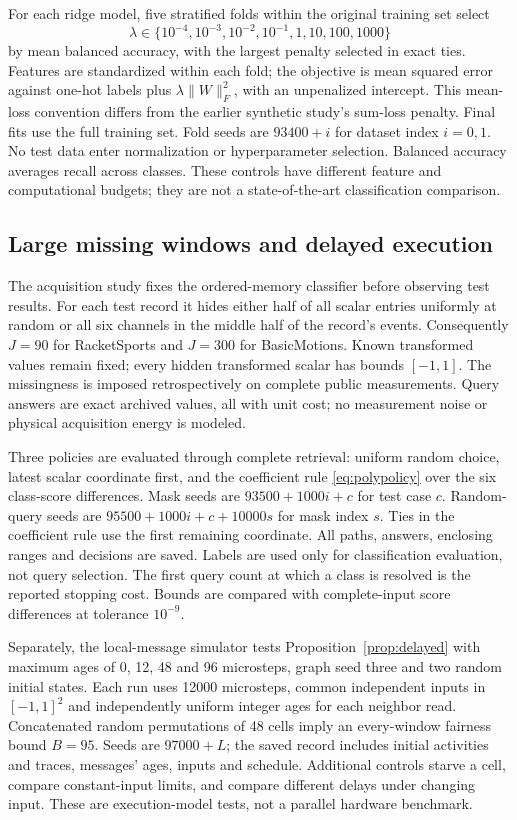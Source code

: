 \documentclass[11pt,a4paper]{article}
\theoremstyle{definition}\newtheorem{definition}[theorem]{Definition}
\begin{document}
For each ridge model, five stratified folds within the original training set select
\[
 \lambda\in\{10^{-4},10^{-3},10^{-2},10^{-1},1,10,100,1000\}
\]
by mean balanced accuracy, with the largest penalty selected in exact ties. Features are standardized within each fold; the objective is mean squared error against one-hot labels plus $\lambda\|W\|_F^2$, with an unpenalized intercept. This mean-loss convention differs from the earlier synthetic study's sum-loss penalty. Final fits use the full training set. Fold seeds are $93400+i$ for dataset index $i=0,1$. No test data enter normalization or hyperparameter selection. Balanced accuracy averages recall across classes. These controls have different feature and computational budgets; they are not a state-of-the-art classification comparison.

\subsection{Large missing windows and delayed execution}
The acquisition study fixes the ordered-memory classifier before observing test results. For each test record it hides either half of all scalar entries uniformly at random or all six channels in the middle half of the record's events. Consequently $J=90$ for RacketSports and $J=300$ for BasicMotions. Known transformed values remain fixed; every hidden transformed scalar has bounds $[-1,1]$. The missingness is imposed retrospectively on complete public measurements. Query answers are exact archived values, all with unit cost; no measurement noise or physical acquisition energy is modeled.

Three policies are evaluated through complete retrieval: uniform random choice, latest scalar coordinate first, and the coefficient rule \eqref{eq:polypolicy} over the six class-score differences. Mask seeds are $93500+1000i+c$ for test case $c$. Random-query seeds are $95500+1000i+c+10000s$ for mask index $s$. Ties in the coefficient rule use the first remaining coordinate. All paths, answers, enclosing ranges and decisions are saved. Labels are used only for classification evaluation, not query selection. The first query count at which a class is resolved is the reported stopping cost. Bounds are compared with complete-input score differences at tolerance $10^{-9}$.

Separately, the local-message simulator tests Proposition~\ref{prop:delayed} with maximum ages of 0, 12, 48 and 96 microsteps, graph seed three and two random initial states. Each run uses 12000 microsteps, common independent inputs in $[-1,1]^2$ and independently uniform integer ages for each neighbor read. Concatenated random permutations of 48 cells imply an every-window fairness bound $B=95$. Seeds are $97000+L$; the saved record includes initial activities and traces, messages' ages, inputs and schedule. Additional controls starve a cell, compare constant-input limits, and compare different delays under changing input. These are execution-model tests, not a parallel hardware benchmark.
\end{document}
